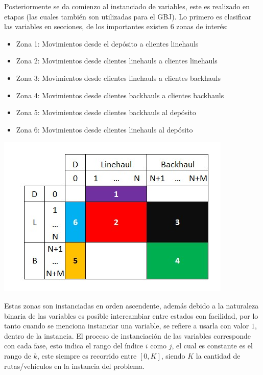 \documentclass[letter, 10pt]{article}
\begin{document}
Posteriormente se da comienzo al instanciado de variables, este es realizado en etapas (las cuales también son utilizadas para el GBJ). Lo primero es clasificar las variables en secciones, de los importantes existen 6 zonas de interés:

\begin{itemize}
    \item Zona 1: Movimientos desde el depósito a clientes linehauls
    \item Zona 2: Movimientos desde clientes linehauls a clientes linehauls
    \item Zona 3: Movimientos desde clientes linehauls a clientes backhauls
    \item Zona 4: Movimientos desde clientes backhauls a clientes backhauls
    \item Zona 5: Movimientos desde clientes backhauls al depósito
    \item Zona 6: Movimientos desde clientes linehauls al depósito
\end{itemize}

\begin{center}
\includegraphics[scale=.75]{Fases.jpg}
\end{center}

Estas zonas son instanciadas en orden ascendente, además debido a la naturaleza binaria de las variables es posible intercambiar entre estados con facilidad, por lo tanto cuando se menciona instanciar una variable, se refiere a usarla con valor $1$, dentro de la instancia. El proceso de instanciación de las variables corresponde con cada fase, esto indica el rango del índice $i$ como $j$, el cual es constante es el rango de $k$, este siempre es recorrido entre $[0, K]$, siendo $K$ la cantidad de rutas/vehículos en la instancia del problema.
\end{document}
